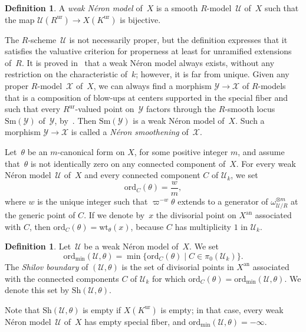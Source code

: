 \documentclass[JEP,XML,SOM,Unicode,NoFloatCountersInSection]{cedram}
\theoremstyle{definition}
\newtheorem{definition}[equation]{Definition}
\numberwithin{equation}{subsection}
\newcommand{\cX}{\ensuremath{\mathscr{X}}}
\newcommand{\cU}{\ensuremath{\mathscr{U}}}
\newcommand{\cY}{\ensuremath{\mathscr{Y}}}
\newcommand{\an}{\mathrm{an}}
\newcommand{\ord}{\mathrm{ord}}
\newcommand{\ordmin}{\ord_{\min}}
\newcommand{\Sh}{\mathrm{Sh}}
\newcommand{\Sm}{\mathrm{Sm}}
\newcommand{\ur}{\mathrm{ur}}
\newcommand{\wt}{\mathrm{wt}}
\let\form\theta
\let\unif\varpi
\begin{document}
\begin{definition}
A {\em weak Néron model} of~$X$ is a smooth $R$\nobreakdash-model~$\cU$ of~$X$ such that the map $\cU(R^{\ur})\to X(K^{\ur})$ is bijective.
\end{definition}

The $R$\nobreakdash-scheme~$\cU$ is not necessarily proper, but the definition expresses that it satisfies the valuative criterion for properness at least for unramified extensions of~$R$. It is proved in~\cite{BLR} that a weak Néron model always exists, without any restriction on the characteristic of~$k$; however, it is far from unique. Given any proper $R$\nobreakdash-model~$\cX$ of~$X$, we can always find a morphism $\cY\to \cX$ of $R$\nobreakdash-models that is a composition of blow-ups at centers supported in the special fiber and such that every $R^{\ur}$-valued point on~$\cY$ factors through the $R$\nobreakdash-smooth locus $\Sm(\cY)$ of~$\cY$, by~\cite[3.4/2]{BLR}. Then $\Sm(\cY)$ is a weak Néron model of~$X$. Such a morphism $\cY\to \cX$ is called a {\em Néron smoothening} of~$\cX$.

Let~$\form$ be an $m$-canonical form on $X$, for some positive integer $m$, and assume that~$\form$ is not identically zero on any connected component of~$X$.
For every weak Néron model~$\cU$ of~$X$ and every connected component $C$ of $\cU_k$, we set
\[
\ord_C(\form)=\frac{w}{m},
\]
where $w$ is the unique integer such that $\unif^{-w} \form$ extends to a generator of $\omega^{\otimes m}_{\cU/R}$ at the generic point of $C$.
If we denote by~$x$ the divisorial point on $X^{\an}$ associated with $C$, then $\ord_C(\form)=\wt_{\form}(x)$, because $C$ has multiplicity $1$ in $\cU_k$.

\begin{definition}\label{defi:shilov}
Let~$\cU$ be a weak Néron model of~$X$. We set
\[
\ordmin(\cU,\form)=\min\{\ord_C(\form)\mid C\in \pi_0(\cU_k)\}.
\]
The {\em Shilov boundary} of $(\cU,\form)$ is the set of divisorial points in $X^{\an}$ associated with the connected components $C$ of $\cU_k$ for which $\ord_C(\form)=\ordmin(\cU,\form)$. We denote this set by $\Sh(\cU,\form)$.
\end{definition}
Note that $\Sh(\cU,\form)$ is empty if $X(K^{\ur})$ is empty; in that case, every weak Néron model~$\cU$ of~$X$ has empty special fiber, and $\ordmin(\cU,\form)=-\infty$.
\end{document}
